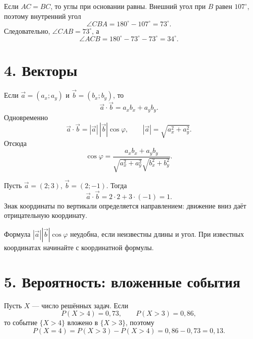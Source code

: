 \documentclass[a4paper,12pt]{article}
\begin{document}
Если $AC=BC$, то углы при основании равны. Внешний угол при $B$ равен $107^\circ$, поэтому внутренний угол
\[
\angle CBA=180^\circ-107^\circ=73^\circ.
\]
Следовательно, $\angle CAB=73^\circ$, а
\[
\angle ACB=180^\circ-73^\circ-73^\circ=34^\circ.
\]

\section*{4. Векторы}
\begin{keybox}
Если $\vec a=(a_x;a_y)$ и $\vec b=(b_x;b_y)$, то
\[
\vec a\cdot\vec b=a_xb_x+a_yb_y.
\]
Одновременно
\[
\vec a\cdot\vec b=|\vec a|\,|\vec b|\cos\varphi,
\qquad
|\vec a|=\sqrt{a_x^2+a_y^2}.
\]
Отсюда
\[
\cos\varphi=
\frac{a_xb_x+a_yb_y}
{\sqrt{a_x^2+a_y^2}\sqrt{b_x^2+b_y^2}}.
\]
\end{keybox}

\begin{examplebox}
Пусть $\vec a=(2;3)$, $\vec b=(2;-1)$. Тогда
\[
\vec a\cdot\vec b=2\cdot2+3\cdot(-1)=1.
\]
Знак координаты по вертикали определяется направлением: движение вниз даёт отрицательную координату.
\end{examplebox}

\begin{warnbox}
Формула $|\vec a||\vec b|\cos\varphi$ неудобна, если неизвестны длины и угол. При известных координатах начинайте с координатной формулы.
\end{warnbox}

\section*{5. Вероятность: вложенные события}
Пусть $X$ --- число решённых задач. Если
\[
P(X>4)=0{,}73,\qquad P(X>3)=0{,}86,
\]
то событие $\{X>4\}$ вложено в $\{X>3\}$, поэтому
\[
P(X=4)=P(X>3)-P(X>4)=0{,}86-0{,}73=0{,}13.
\]

\begin{center}
\end{center}
\end{document}
